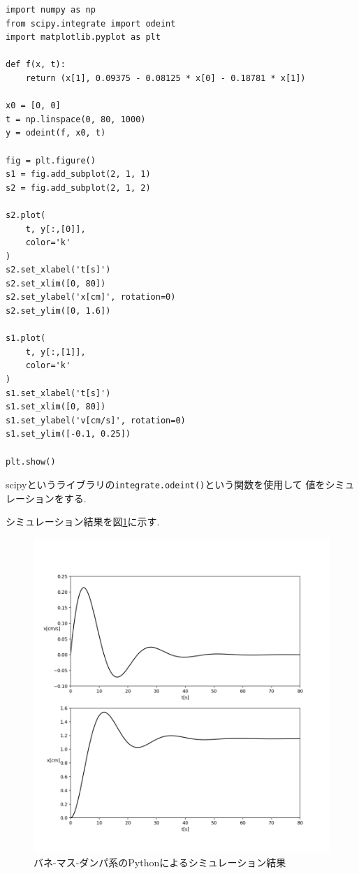 \documentclass[titlepage]{jsarticle}
\begin{document}
            \begin{lstlisting}[caption=simulate.py, label=lst:bmdpy]
import numpy as np
from scipy.integrate import odeint
import matplotlib.pyplot as plt

def f(x, t):
    return (x[1], 0.09375 - 0.08125 * x[0] - 0.18781 * x[1])

x0 = [0, 0]
t = np.linspace(0, 80, 1000)
y = odeint(f, x0, t)

fig = plt.figure()
s1 = fig.add_subplot(2, 1, 1)
s2 = fig.add_subplot(2, 1, 2)

s2.plot(
    t, y[:,[0]],
    color='k'
)
s2.set_xlabel('t[s]')
s2.set_xlim([0, 80])
s2.set_ylabel('x[cm]', rotation=0)
s2.set_ylim([0, 1.6])

s1.plot(
    t, y[:,[1]],
    color='k'
)
s1.set_xlabel('t[s]')
s1.set_xlim([0, 80])
s1.set_ylabel('v[cm/s]', rotation=0)
s1.set_ylim([-0.1, 0.25])

plt.show()\end{lstlisting}

            scipyというライブラリの\verb|integrate.odeint()|という関数を使用して
            値をシミュレーションをする.

            シミュレーション結果を図\ref{fig:bmdpy}に示す.

            \begin{figure}[h]
                \centering
                \includegraphics[width=15cm]{img/bmdpy.png}
                \caption{バネ-マス-ダンパ系のPythonによるシミュレーション結果}
                \label{fig:bmdpy}
            \end{figure}
\end{document}
